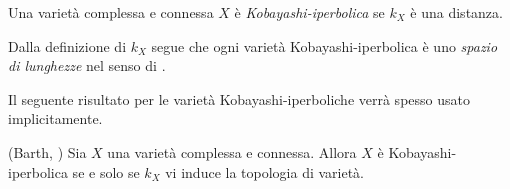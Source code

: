 \begin{defn}
    Una varietà complessa e connessa $X$ è \textit{Kobayashi-iperbolica} se $k_X$ è una distanza.
\end{defn}

\begin{oss} \label{lengthspace}
    Dalla definizione di $k_X$ segue che ogni varietà Kobayashi-iperbolica è uno \textit{spazio di lunghezze} nel senso di \cite[Part I, Definition 3.1]{BH}.
\end{oss}

Il seguente risultato per le varietà Kobayashi-iperboliche verrà spesso usato implicitamente.

\begin{prop}
    (Barth, \cite{B2}) Sia $X$ una varietà complessa e connessa. Allora $X$ è Kobayashi-iperbolica se e solo se $k_X$ vi induce la topologia di varietà.
\end{prop}